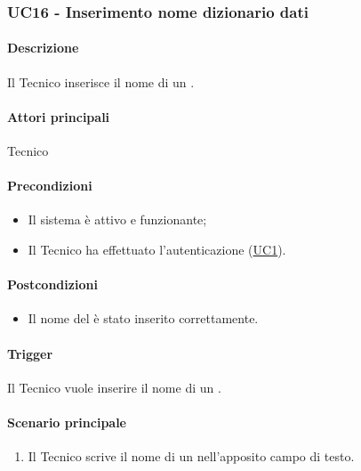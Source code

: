 \subsubsection{UC16 - Inserimento nome dizionario dati}\label{UC16}
\paragraph*{Descrizione}
Il Tecnico inserisce il nome di un .

\paragraph*{Attori principali}
Tecnico

\paragraph*{Precondizioni}
\begin{itemize}
  \item Il sistema è attivo e funzionante;
  \item Il Tecnico ha effettuato l'autenticazione (\hyperref[UC1]{UC1}).
\end{itemize}

\paragraph*{Postcondizioni}
\begin{itemize}
  \item Il nome del  è stato inserito correttamente.
\end{itemize}

\paragraph*{Trigger}
Il Tecnico vuole inserire il nome di un .

\paragraph*{Scenario principale}
\begin{enumerate}
  \item Il Tecnico scrive il nome di un  nell'apposito campo di testo.
\end{enumerate}